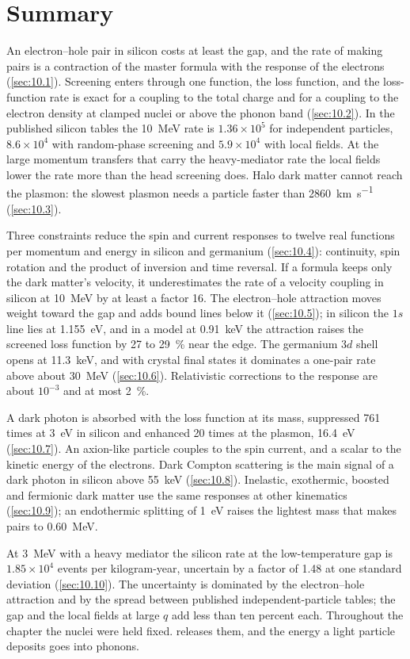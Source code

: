 \section*{Summary}

An electron--hole pair in silicon costs at least the gap, and the rate of making pairs is a contraction of the master formula with the response of the electrons (\cref{sec:10.1}). Screening enters through one function, the loss function, and the loss-function rate is exact for a coupling to the total charge and for a coupling to the electron density at clamped nuclei or above the phonon band (\cref{sec:10.2}). In the published silicon tables the \SI{10}{MeV} rate is $1.36\times10^5$ for independent particles, $8.6\times10^4$ with random-phase screening and $5.9\times10^4$ with local fields. At the large momentum transfers that carry the heavy-mediator rate the local fields lower the rate more than the head screening does. Halo dark matter cannot reach the plasmon: the slowest plasmon needs a particle faster than \SI{2860}{km.s^{-1}} (\cref{sec:10.3}).

Three constraints reduce the spin and current responses to twelve real functions per momentum and energy in silicon and germanium (\cref{sec:10.4}): continuity, spin rotation and the product of inversion and time reversal. If a formula keeps only the dark matter's velocity, it underestimates the rate of a velocity coupling in silicon at \SI{10}{MeV} by at least a factor 16. The electron--hole attraction moves weight toward the gap and adds bound lines below it (\cref{sec:10.5}); in silicon the $1s$ line lies at \SI{1.155}{eV}, and in a model at \SI{0.91}{keV} the attraction raises the screened loss function by 27 to \SI{29}{\percent} near the edge. The germanium $3d$ shell opens at \SI{11.3}{keV}, and with crystal final states it dominates a one-pair rate above about \SI{30}{MeV} (\cref{sec:10.6}). Relativistic corrections to the response are about $10^{-3}$ and at most \SI{2}{\percent}.

A dark photon is absorbed with the loss function at its mass, suppressed 761 times at \SI{3}{eV} in silicon and enhanced 20 times at the plasmon, \SI{16.4}{eV} (\cref{sec:10.7}). An axion-like particle couples to the spin current, and a scalar to the kinetic energy of the electrons. Dark Compton scattering is the main signal of a dark photon in silicon above \SI{55}{keV} (\cref{sec:10.8}). Inelastic, exothermic, boosted and fermionic dark matter use the same responses at other kinematics (\cref{sec:10.9}); an endothermic splitting of \SI{1}{eV} raises the lightest mass that makes pairs to \SI{0.60}{MeV}.

At \SI{3}{MeV} with a heavy mediator the silicon rate at the low-temperature gap is $1.85\times10^4$ events per kilogram-year, uncertain by a factor of 1.48 at one standard deviation (\cref{sec:10.10}). The uncertainty is dominated by the electron--hole attraction and by the spread between published independent-particle tables; the gap and the local fields at large $q$ add less than ten percent each. Throughout the chapter the nuclei were held fixed.  releases them, and the energy a light particle deposits goes into phonons.
